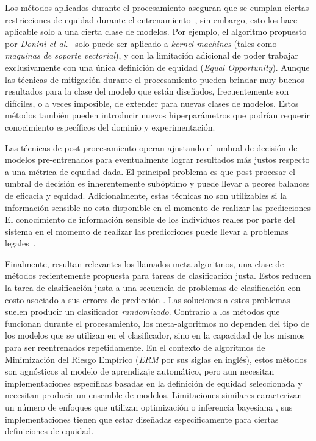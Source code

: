 Los métodos aplicados durante el procesamiento aseguran que se cumplan ciertas restricciones de equidad durante el entrenamiento~\parencite{donini2018empirical, zafar2017fairness, zafar2019fairness}, sin embargo, esto los hace aplicable solo a una cierta clase de modelos.
Por ejemplo, el algoritmo propuesto por \emph{Donini et al.}~\parencite{donini2018empirical} solo puede ser aplicado a \emph{kernel machines} (tales como \emph{maquinas de soporte vectorial}), y con la limitación adicional de poder trabajar exclusivamente con una única definición de equidad (\emph{Equal Opportunity}).
Aunque las técnicas de mitigación durante el procesamiento pueden brindar muy buenos resultados para la clase del modelo que están diseñados, frecuentemente son difíciles, o a veces imposible, de extender para nuevas clases de modelos.
Estos métodos también pueden introducir nuevos hiperparámetros que podrían requerir conocimiento específicos del dominio y experimentación.

Las técnicas de post-procesamiento operan ajustando el umbral de decisión de modelos pre-entrenados para eventualmente lograr resultados más justos respecto a una métrica de equidad dada.
El principal problema es que post-procesar el umbral de decisión es inherentemente subóptimo y puede llevar a peores balances de eficacia y equidad.
Adicionalmente, estas técnicas no son utilizables si la información sensible no esta disponible en el momento de realizar las predicciones
El conocimiento de información sensible de los individuos reales por parte del sistema en el momento de realizar las predicciones puede llevar a problemas legales~\parencite{MacCarthy2018StandardsOF}.

Finalmente, resultan relevantes los llamados meta-algoritmos, una clase de métodos recientemente propuesta para tareas de clasificación justa.
Estos reducen la tarea de clasificación justa a una secuencia de problemas de clasificación con costo asociado a sus errores de predicción \parencite{agarwal2018reductions, agarwal2019fair, kearns2018preventing}.
Las soluciones a estos problemas suelen producir un clasificador \emph{randomizado}. Contrario a los métodos que funcionan durante el procesamiento, los meta-algoritmos no dependen del tipo de los modelos que se utilizan en el clasificador, sino en la capacidad de los mismos para ser reentrenados repetidamente.
En el contexto de algoritmos de Minimización del Riesgo Empírico (\emph{ERM} por sus siglas en inglés), estos métodos son agnósticos al modelo de aprendizaje automático, pero aun necesitan implementaciones específicas basadas en la definición de equidad seleccionada y necesitan producir un ensemble de modelos. Limitaciones similares caracterizan un número de enfoques que utilizan optimización \parencite{chiappa2018causal,Dimitrakakis_Liu_Parkes_Radanovic_2019} o inferencia bayesiana \parencite{kearns2018preventing,thomas2019preventing}, sus implementaciones tienen que estar diseñadas específicamente para ciertas definiciones de equidad.

